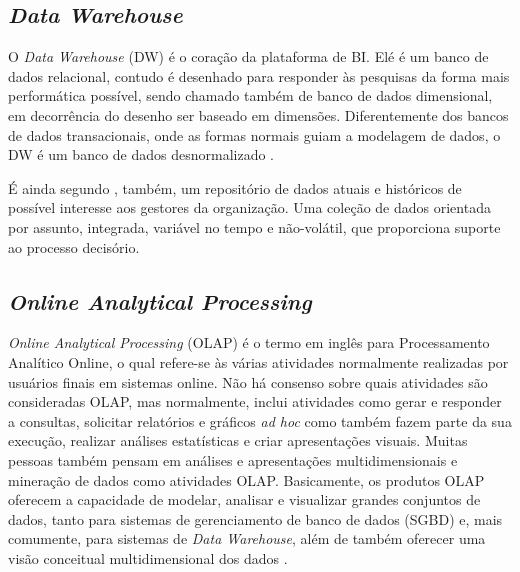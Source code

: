 \subsection{\textit{Data Warehouse}} \label{subD-datawarehouse}
O \textit{Data Warehouse} (DW) é o coração da plataforma de BI. Elé é um banco de dados relacional, contudo é desenhado para responder às pesquisas da forma mais performática possível, sendo chamado também de banco de dados dimensional, em decorrência do desenho ser baseado em dimensões. Diferentemente dos bancos de dados transacionais, onde as formas normais guiam a modelagem de dados, o DW é um banco de dados desnormalizado \cite{braghittoni2017}.

É ainda segundo , também, um repositório de dados atuais e históricos de possível interesse aos gestores da organização. Uma coleção de dados orientada por assunto, integrada, variável no tempo e não-volátil, que proporciona suporte ao processo decisório.
\subsection{\textit{Online Analytical Processing}} \label{subD-olap}
\textit{Online Analytical Processing} (OLAP) é o termo em inglês para Processamento Analítico Online, o qual refere-se às várias atividades normalmente realizadas por usuários finais em sistemas online. Não há consenso sobre quais atividades são consideradas OLAP, mas normalmente, inclui atividades como gerar e responder a consultas, solicitar relatórios e gráficos \textit{ad hoc} como também fazem parte da sua execução, realizar análises estatísticas e criar apresentações visuais. Muitas pessoas também pensam em análises e apresentações multidimensionais e mineração de dados como atividades OLAP. Basicamente, os produtos OLAP oferecem a capacidade de modelar, analisar e visualizar grandes conjuntos de dados, tanto para sistemas de gerenciamento de banco de dados (SGBD) e, mais comumente, para sistemas de \textit{Data Warehouse}, além de também oferecer uma visão conceitual multidimensional dos dados \cite{turban2008}.

